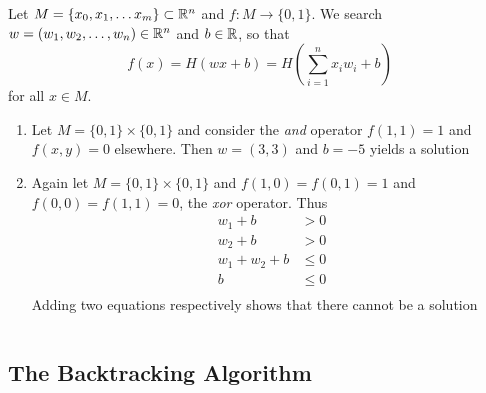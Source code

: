 \begin{definition}
Let \( M = \{ x_0, x_1, \dots x_m \} \subset \mathbb{R}^n \) and \( f: M \to \{ 0, 1 \} \).
We search \( w = (w_1, w_2, \dots, w_n) \in \mathbb{R}^n \) and \( b \in \mathbb{R} \), so that 
\[
	f(x) = H(wx + b) = H(\sum_{i=1}^n x_i w_i + b)
\]
for all \( x \in M \).
\end{definition}
\bigskip


\begin{examples}\hfill
    \begin{enumerate}
        \item Let \( M = \{ 0, 1 \} \times \{ 0, 1 \} \) and consider the \emph{and} operator 
		    \( f(1, 1) = 1 \) and \( f(x, y) = 0 \) elsewhere. Then \( w = (3, 3) \) and \( b = -5 \) 
			yields a solution
        \item Again let \( M = \{ 0, 1 \} \times \{ 0, 1 \} \) and \( f(1, 0) = f(0, 1) = 1 \) and 
			\( f(0, 0) = f(1, 1) = 0 \), the \emph{xor} operator. Thus
				\[
					\begin{split}
						w_1 + b & > 0 \\
						w_2 + b & > 0 \\
						w_1 + w_2 + b & \le 0 \\
						b & \le 0 \\
					\end{split}
				\]
			Adding two equations respectively shows that there cannot be a solution
	\end{enumerate}
\end{examples}
\bigskip


\begin{algorithm}[Perceptron]\label{algo:perceptron}
\end{algorithm}
\inputminted[fontsize=\small, framesep=0.35cm, frame=lines, python3=true]{python}{perceptron.py}
\bigskip


\subsection{The Backtracking Algorithm}


